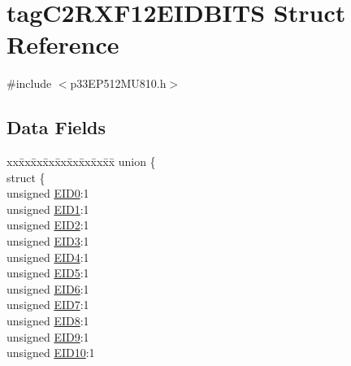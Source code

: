 \hypertarget{structtag_c2_r_x_f12_e_i_d_b_i_t_s}{}\section{tag\+C2\+R\+X\+F12\+E\+I\+D\+B\+I\+TS Struct Reference}
\label{structtag_c2_r_x_f12_e_i_d_b_i_t_s}


{\ttfamily \#include $<$p33\+E\+P512\+M\+U810.\+h$>$}

\subsection*{Data Fields}
\begin{DoxyCompactItemize}
\item 
\begin{tabbing}
xx\=xx\=xx\=xx\=xx\=xx\=xx\=xx\=xx\=\kill
union \{\\
\>struct \{\\
\>\>unsigned \hyperlink{structtag_c2_r_x_f12_e_i_d_b_i_t_s_a9da8b7b30247e4f9cd8cc056549aa9fd}{EID0}:1\\
\>\>unsigned \hyperlink{structtag_c2_r_x_f12_e_i_d_b_i_t_s_afd6c139491d147c1262f3d051c6691e9}{EID1}:1\\
\>\>unsigned \hyperlink{structtag_c2_r_x_f12_e_i_d_b_i_t_s_a36ec62d8d3c5acd5d15e6691dc099a94}{EID2}:1\\
\>\>unsigned \hyperlink{structtag_c2_r_x_f12_e_i_d_b_i_t_s_ab895f7d0ac289a0383b607cbc62eebe2}{EID3}:1\\
\>\>unsigned \hyperlink{structtag_c2_r_x_f12_e_i_d_b_i_t_s_a136d5a709d6618d40acceccb43036656}{EID4}:1\\
\>\>unsigned \hyperlink{structtag_c2_r_x_f12_e_i_d_b_i_t_s_a8dffb2d86a6c184df505ae7c71a58710}{EID5}:1\\
\>\>unsigned \hyperlink{structtag_c2_r_x_f12_e_i_d_b_i_t_s_af8a8574102515d8f1a4b7fd1685d0532}{EID6}:1\\
\>\>unsigned \hyperlink{structtag_c2_r_x_f12_e_i_d_b_i_t_s_a84c3262e67f8d5fd387ac10bde6fa9b1}{EID7}:1\\
\>\>unsigned \hyperlink{structtag_c2_r_x_f12_e_i_d_b_i_t_s_acca25e0b7d86eb499d01f85222baea87}{EID8}:1\\
\>\>unsigned \hyperlink{structtag_c2_r_x_f12_e_i_d_b_i_t_s_ac6748f73d4ada8538b06548be4f396c2}{EID9}:1\\
\>\>unsigned \hyperlink{structtag_c2_r_x_f12_e_i_d_b_i_t_s_a9cea8e77ecbb72bd3b08102412793725}{EID10}:1\\

\end{tabbing}
\end{DoxyCompactItemize}
